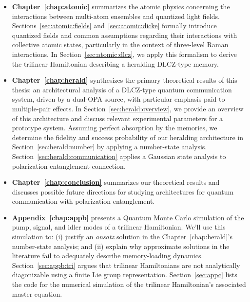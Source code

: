 \documentclass[aps,twocolumn,secnumarabic,amsmath,amssymb,pra,groupedaddress,
showpacs, showkeys]{revtex4-1}
\begin{document}
\begin{itemize}
	\item \textbf{Chapter~\ref{chap:atomic}} summarizes the atomic physics
          concerning the interactions between multi-atom ensembles and
          quantized light fields. Sections~\ref{sec:atomic:fields}
          and~\ref{sec:atomic:dicke} formally introduce quantized fields and
          common assumptions regarding their interactions with collective
          atomic states, particularly in the context of three-level Raman
          interactions. In Section~\ref{sec:atomic:dlcz}, we apply this
          formalism to derive the trilinear Hamiltonian describing a heralding
          DLCZ-type memory.  

	\item \textbf{Chapter~\ref{chap:herald}} synthesizes the primary
          theoretical results of this thesis: an architectural analysis of a
          DLCZ-type quantum communication system, driven by a dual-OPA source,
          with particular emphasis paid to multiple-pair effects. In
          Section~\ref{sec:herald:overview}, we provide an overview of this
          architecture and discuss relevant experimental parameters for a
          prototype system.  Assuming perfect absorption by the memories, we
          determine the fidelity and success probability of our heralding
          architecture in Section~\ref{sec:herald:number} by applying a
          number-state analysis. Section~\ref{sec:herald:communication} applies
          a Gaussian state analysis to polarization entanglement connection.

	\item \textbf{Chapter~\ref{chap:conclusion}} summarizes our theoretical
          results and discusses possible future directions for studying
          architectures for quantum communication with polarization
          entanglement.

	\item \textbf{Appendix~\ref{chap:appb}} presents a Quantum Monte Carlo
          simulation of the pump, signal, and idler modes of a trilinear
          Hamiltonian. We'll use this simulation to: (i) justify an
          \emph{ansatz} solution in the Chapter~\ref{chap:herald}'s
          number-state analysis; and (ii) explain why approximate solutions in
          the literature fail to adequately describe memory-loading
          dynamics. Section~\ref{sec:appb:tri} argues that trilinear
          Hamiltonians are not analytically diagonizable using a finite Lie
          group representation. Section~\ref{sec:appc} lists the code for the
          numerical simulation of the trilinear Hamiltonian's associated master
          equation. 
\end{itemize}
\end{document}
